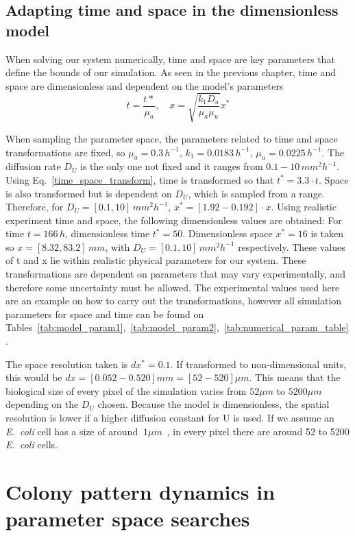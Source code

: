 \subsection{Adapting time and space in the dimensionless model}
When solving our system numerically, time and space are key parameters that define the bounds of our simulation.
As seen in the previous chapter, time and space are dimensionless and dependent on the model’s parameters
\begin{equation}\label{time_space_transform}
    t = \frac{t*}{\mu _a}, \quad x = \sqrt{\frac{k_{1}D_{u}}{\mu_{a}\mu_{u}}}x^*
\end{equation}

When sampling the parameter space, the parameters related to time and space transformations are fixed, so $\mu_a = 0.3 \,h^{-1}, \,k_1 = 0.0183 \,h^{-1},\, \mu_u = 0.0225\, h^{-1}$.
The diffusion rate $D_U$ is the only one not fixed and it ranges from $0.1-10 \,mm^2h^{-1}$.
Using Eq.~\ref{time_space_transform}, time is transformed so that $t^*=3.3\cdot t$.
Space is also transformed but is dependent on $D_U$, which is sampled from a range.
Therefore, for $D_U = [0.1, 10] \,mm^2 h^{-1}$, $x^* =[1.92 - 0.192] \cdot x$.
Using realistic experiment time and space, the following dimensionless values are obtained:
For time $t=166\,h$, dimensionless time $t^*=50$.
Dimensionless space  $x^*=16$ is taken so  $x = [8.32, 83.2] \,mm$, with $D_U = [0.1, 10]\, mm^2 h^{-1}$ respectively.
These values of t and x lie within realistic physical parameters for our system.
These transformations are dependent on parameters that may vary experimentally, and therefore some uncertainty must be allowed.
The experimental values used here are an example on how to carry out the transformations, however all simulation parameters for space and time can be found on Tables~\ref{tab:model_param1},~\ref{tab:model_param2},~\ref{tab:numerical_param_table}.

The space resolution taken is $dx^*=0.1$.
If transformed to non-dimensional units, this would be $dx =[0.052-0.520] mm = [52-520] \mu m$.
This means that the biological size of every pixel of the simulation varies from $52\mu m$ to $5200\mu m$ depending on the $D_{U}$ chosen.
Because the model is dimensionless, the spatial resolution is lower if a higher diffusion constant for U is used.
If we assume an \textit{E.~coli} cell has a size of around $~1\mu m$~\parencite{shiomi2009genetic}, in every pixel there are around 52 to 5200 \textit{E.~coli} cells.
\section{Colony pattern dynamics in parameter space searches}

